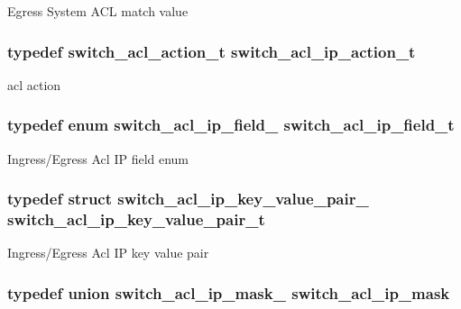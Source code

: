 Egress System A\+C\+L match value \hypertarget{group__ACL_gab7f421bbb84792334752f0013c9577d4}{
\subsubsection[{switch\+\_\+acl\+\_\+ip\+\_\+action\+\_\+t}]{\setlength{\rightskip}{0pt plus 5cm}typedef {\bf switch\+\_\+acl\+\_\+action\+\_\+t} {\bf switch\+\_\+acl\+\_\+ip\+\_\+action\+\_\+t}}}\label{group__ACL_gab7f421bbb84792334752f0013c9577d4}
acl action \hypertarget{group__ACL_gace0502c1033d71f9f41503531d259a19}{
\subsubsection[{switch\+\_\+acl\+\_\+ip\+\_\+field\+\_\+t}]{\setlength{\rightskip}{0pt plus 5cm}typedef enum {\bf switch\+\_\+acl\+\_\+ip\+\_\+field\+\_\+}  {\bf switch\+\_\+acl\+\_\+ip\+\_\+field\+\_\+t}}}\label{group__ACL_gace0502c1033d71f9f41503531d259a19}
Ingress/\+Egress Acl I\+P field enum \hypertarget{group__ACL_gac532e149a15c4dc5b3b405a03f884725}{
\subsubsection[{switch\+\_\+acl\+\_\+ip\+\_\+key\+\_\+value\+\_\+pair\+\_\+t}]{\setlength{\rightskip}{0pt plus 5cm}typedef struct {\bf switch\+\_\+acl\+\_\+ip\+\_\+key\+\_\+value\+\_\+pair\+\_\+}  {\bf switch\+\_\+acl\+\_\+ip\+\_\+key\+\_\+value\+\_\+pair\+\_\+t}}}\label{group__ACL_gac532e149a15c4dc5b3b405a03f884725}
Ingress/\+Egress Acl I\+P key value pair \hypertarget{group__ACL_ga1a194b7137a5eebe4941a321815f4263}{
\subsubsection[{switch\+\_\+acl\+\_\+ip\+\_\+mask}]{\setlength{\rightskip}{0pt plus 5cm}typedef union {\bf switch\+\_\+acl\+\_\+ip\+\_\+mask\+\_\+}  {\bf switch\+\_\+acl\+\_\+ip\+\_\+mask}}}\label{group__ACL_ga1a194b7137a5eebe4941a321815f4263}
